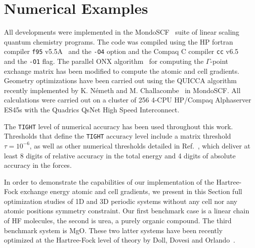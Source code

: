 \documentclass[prl,twocolumn,showpacs,twocolumngrid,superbib]{revtex4}
\begin{document}
\section{Numerical Examples}\label{Sec:NumExamples}
All developments were implemented in the {\sc MondoSCF}~\cite{MondoSCF} suite of
linear scaling quantum chemistry programs. 
The code was compiled using the HP fortran compiler {\tt f95}
v5.5A~\cite{f95-v5.5a} and the {\tt -O4} option and the Compaq
C compiler {\tt cc} v6.5~\cite{cc-v6.5} and the {\tt -O1} flag.
The parallel ONX algorithm~\cite{VWeber05a} for computing
the $\Gamma$-point exchange matrix has been modified to compute
the atomic and cell gradients.
Geometry optimizations have been carried out using the QUICCA algorithm recently
implemented by K. N\'emeth and M. Challacombe~\cite{KNemeth04,KNemeth05} in {\sc MondoSCF}. 
All calculations were carried out on a cluster of 256 4-CPU HP/Compaq
Alphaserver ES45s with the Quadrics QsNet High Speed Interconnect.



The {\tt TIGHT} level of numerical accuracy has been used throughout this work.  
Thresholds that define the {\tt TIGHT} accuracy level include a matrix 
threshold $\tau=10^{-6}$, as well as other numerical thresholds 
detailed in Ref.~\cite{CTymczak04a}, which deliver at least 8 digits of 
relative accuracy in the total energy and 4 digits of absolute accuracy 
in the forces.  

In order to demonstrate the capabilities of our implementation of the
Hartree-Fock exchange energy atomic and cell gradients, we present in this Section 
full optimization studies of 1D and 3D periodic systems without any cell 
nor any atomic positions symmetry constraint. 
Our first benchmark case is a linear chain of HF molecules, the second is
urea, a purely organic compound. The third benchmark system is MgO. 
These two latter systems have been recently optimized at the Hartree-Fock 
level of theory by Doll, Dovesi and Orlando~\cite{KDoll04}.
\end{document}
